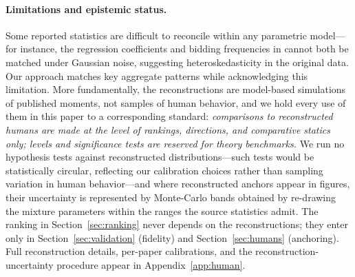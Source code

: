 \paragraph{Limitations and epistemic status.}
Some reported statistics are difficult to reconcile within any parametric
model---for instance, the regression coefficients and bidding frequencies in
\citet{kagel1993independent} cannot both be matched under Gaussian noise,
suggesting heteroskedasticity in the original data. Our approach matches key
aggregate patterns while acknowledging this limitation. More fundamentally, the
reconstructions are model-based simulations of published moments, not samples
of human behavior, and we hold every use of them in this paper to a
corresponding standard: \emph{comparisons to reconstructed humans are made at
the level of rankings, directions, and comparative statics only; levels and
significance tests are reserved for theory benchmarks.} We run no hypothesis
tests against reconstructed distributions---such tests would be statistically
circular, reflecting our calibration choices rather than sampling variation in
human behavior---and where reconstructed anchors appear in figures, their
uncertainty is represented by Monte-Carlo bands obtained by re-drawing the
mixture parameters within the ranges the source statistics admit. The ranking
in Section~\ref{sec:ranking} never depends on the reconstructions; they enter
only in Section~\ref{sec:validation} (fidelity) and Section~\ref{sec:humans}
(anchoring). Full reconstruction details, per-paper calibrations, and the
reconstruction-uncertainty procedure appear in Appendix~\ref{app:human}.
